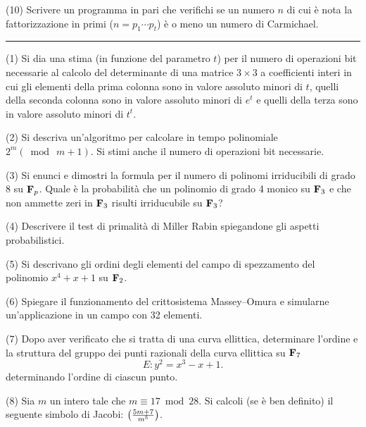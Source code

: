 \item{(10)} Scrivere un programma in pari che
verifichi se un numero $n$ di cui \`{e} nota la fattorizzazione in
primi ($n=p_1\cdots p_t$) \`{e} o meno un numero di Carmichael.\bigskip
\bigskip

\hrule
\bigskip\medskip

\item{(1)} Si dia una stima (in funzione del parametro $t$) per il
numero di operazioni bit necessarie al calcolo del determinante di
una matrice $3\times3$ a coefficienti interi in cui gli elementi
della prima colonna sono in valore assoluto minori di $t$, quelli
della seconda colonna sono in valore assoluto minori di $e^t$ e
quelli della terza sono in valore assoluto minori di $t^t$.\bigskip

\item{(2)} Si descriva un'algoritmo per calcolare in tempo
polinomiale $2^m(\bmod\ m+1)$. Si stimi anche il numero di
operazioni bit necessarie.\bigskip

\item{(3)} Si enunci e dimostri la formula per il numero di
polinomi irriducibili di grado $8$ su ${\bf F}_p$. Quale \`{e} la
probabilit\`{a} che un polinomio di grado 4 monico su ${\bf F}_3$
e che non ammette zeri in ${\bf F}_3$ risulti irriducubile su
${\bf F}_3$? \bigskip

\item{(4)} Descrivere il test di primalit\`{a} di Miller Rabin
spiegandone gli aspetti probabilistici.
  \bigskip

\item{(5)} Si descrivano gli ordini degli elementi del campo di
spezzamento del polinomio $x^4+x+1$ su ${\bf F}_2$.
  \bigskip

\item{(6)} Spiegare il funzionamento del crittosistema
Massey--Omura e simularne un'applicazione in un campo con 32
elementi.
\bigskip

\item{(7)} Dopo aver verificato che si tratta di una curva
ellittica, determinare l'ordine e la struttura del gruppo dei
punti razionali della curva ellittica su ${\bf F}_{7}$
$$E: y^2=x^3-x+1.$$
determinando l'ordine di ciascun punto.\bigskip

\item{(8)} Sia $m$ un intero tale che $m\equiv17\bmod28$.
Si calcoli (se \`{e} ben definito) il seguente simbolo di Jacobi:
$\left({5m+7 \over m^5}\right)$.
\bigskip


